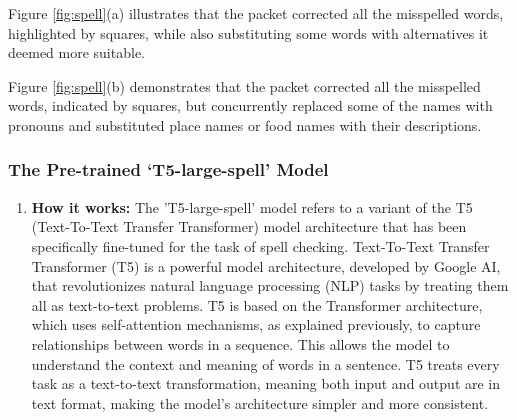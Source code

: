 \begin{enumerate}
    Figure \ref{fig:spell}(a) illustrates that the packet corrected all the misspelled words, highlighted by squares, while also substituting some words with alternatives it deemed more suitable.

    Figure \ref{fig:spell}(b) demonstrates that the packet corrected all the misspelled words, indicated by squares, but concurrently replaced some of the names with pronouns and substituted place names or food names with their descriptions.
\end{enumerate}


\subsubsection{The Pre-trained ‘T5-large-spell’ Model}
\begin{enumerate}
    \item \textbf{How it works:}
    The 'T5-large-spell' model refers to a variant of the T5 (Text-To-Text Transfer Transformer) model architecture that has been specifically fine-tuned for the task of spell checking. Text-To-Text Transfer Transformer (T5) is a powerful model architecture, developed by Google AI, that revolutionizes natural language processing (NLP) tasks by treating them all as text-to-text problems. T5 is based on the Transformer architecture, which uses self-attention mechanisms, as explained previously, to capture relationships between words in a sequence. This allows the model to understand the context and meaning of words in a sentence. T5 treats every task as a text-to-text transformation, meaning both input and output are in text format, making the model’s architecture simpler and more consistent.
    

\end{enumerate}
